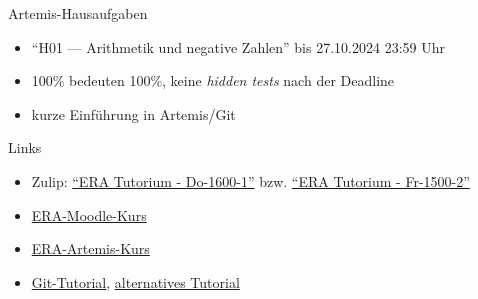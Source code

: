 \documentclass[
  german,            %
  aspectratio=169,    %
]{tumbeamer}
\begin{document}
\begin{frame}[c]{Artemis-Hausaufgaben}{}
  \begin{itemize}
    \item \enquote{H01 --- Arithmetik und negative Zahlen} bis 27.10.2024 23:59 Uhr
    \item 100\% bedeuten 100\%, keine \emph{hidden tests} nach der Deadline
    \item kurze Einführung in Artemis/Git
  \end{itemize}
\end{frame}

\begin{frame}[fragile, c]{Links}{}
  \begin{itemize}
    \item Zulip: \href{https://zulip.in.tum.de/#narrow/stream/2661-ERA-Tutorium---Do-1600-1}{\enquote{ERA Tutorium - Do-1600-1}}
          bzw. \href{https://zulip.in.tum.de/#narrow/stream/2675-ERA-Tutorium---Fr-1500-2 }{\enquote{ERA Tutorium - Fr-1500-2}}
    \item \href{https://www.moodle.tum.de/course/view.php?id=100633}{ERA-Moodle-Kurs}
    \item \href{https://artemis.in.tum.de/courses/401}{ERA-Artemis-Kurs}
    \item \href{https://git-scm.com/docs/gittutorial}{Git-Tutorial}, \href{https://rogerdudler.github.io/git-guide/}{alternatives Tutorial}
  \end{itemize}
\end{frame}

\maketitle
\end{document}
